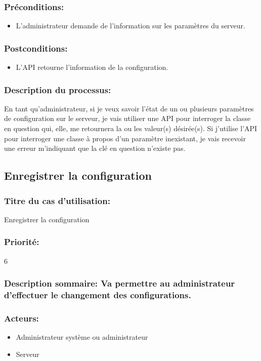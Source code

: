 \documentclass{scrreprt}
\begin{document}
\subsubsection{Préconditions:}
\begin{itemize}
    \item L'administrateur demande de l'information sur les paramètres du serveur.
\end{itemize} 
\subsubsection{Postconditions:}
\begin{itemize}
    \item  L'API retourne l'information de la configuration.    
\end{itemize} 
\subsubsection{Description du processus:}En tant qu'administrateur, si je veux savoir l'état de un ou plusieurs paramètres de
configuration sur le serveur, je vais utiliser une API pour interroger la
classe en question qui, elle, me retournera la ou les valeur(s) désirée(s).
Si j'utilise l'API pour interroger une classe à propos d'un paramètre
inexistant, je vais recevoir une erreur m'indiquant que la clé en question
n'existe pas.

\subsection{Enregistrer la configuration}
\subsubsection{Titre du cas d'utilisation:} Enregistrer la configuration
\subsubsection{Priorité:} 6
\subsubsection{Description sommaire: Va permettre au administrateur d'effectuer le changement des configurations.}
\subsubsection{Acteurs:}
\begin{itemize}
	\item Administrateur système ou administrateur
    \item Serveur
\end{itemize}
\end{document}
